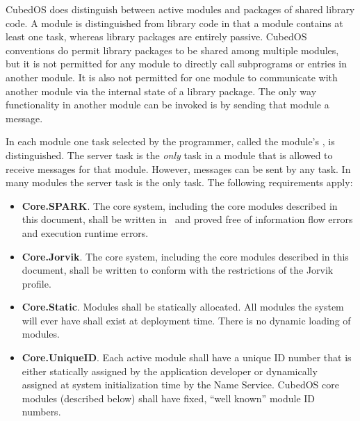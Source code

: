 CubedOS does distinguish between active modules and packages of shared library code. A module is
distinguished from library code in that a module contains at least one task, whereas library
packages are entirely passive. CubedOS conventions do permit library packages to be shared among
multiple modules, but it is not permitted for any module to directly call subprograms or entries
in another module. It is also not permitted for one module to communicate with another module
via the internal state of a library package.  The only way functionality in another module can be invoked is by sending that
module a message.

In each module one task selected by the programmer, called the module's ,
is distinguished. The server task is the \emph{only} task in a module that is allowed to receive
messages for that module. However, messages can be sent by any task. In many modules the server
task is the only task. The following requirements apply:

\begin{itemize}
\item \textbf{Core.SPARK}. The core system, including the core modules described in this
  document, shall be written in \SPARK\ and proved free of information flow errors and execution
  runtime errors.
\item \textbf{Core.Jorvik}. The core system, including the core modules described in this
  document, shall be written to conform with the restrictions of the Jorvik profile.
\item \textbf{Core.Static}. Modules shall be statically allocated. All modules the system will
  ever have shall exist at deployment time. There is no dynamic loading of modules. 
\item \textbf{Core.UniqueID}. Each active module shall have a unique ID number that is either
  statically assigned by the application developer or dynamically assigned at system
  initialization time by the Name Service.  CubedOS core
  modules (described below) shall have fixed, ``well known'' module ID numbers.
\end{itemize}

